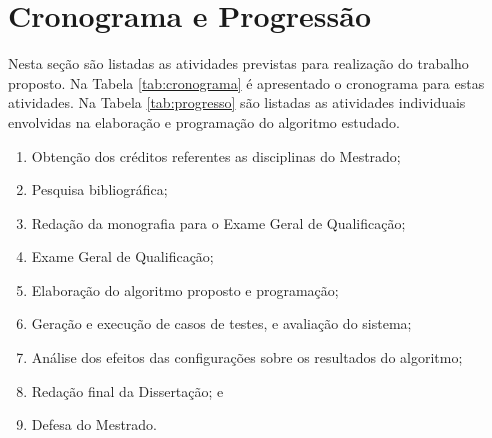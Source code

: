 \documentclass[12pt]{article}
\begin{document}
\newpage

\section{Cronograma e Progressão}

Nesta seção são listadas as atividades previstas para realização do trabalho proposto.
Na Tabela \ref{tab:cronograma} é apresentado o cronograma para estas atividades.
Na Tabela \ref{tab:progresso} são listadas as atividades individuais envolvidas na elaboração
e programação do algoritmo estudado.

\begin{enumerate}
	\item Obtenção dos créditos referentes as disciplinas do Mestrado;
	\item Pesquisa bibliográfica;
	\item Redação da monografia para o Exame Geral de Qualificação;
	\item Exame Geral de Qualificação;
	\item Elaboração do algoritmo proposto e programação;
	\item Geração e execução de casos de testes, e avaliação do sistema;
	\item Análise dos efeitos das configurações sobre os resultados do algoritmo;
	\item Redação final da Dissertação; e
	\item Defesa do Mestrado.
\end{enumerate}
\end{document}
